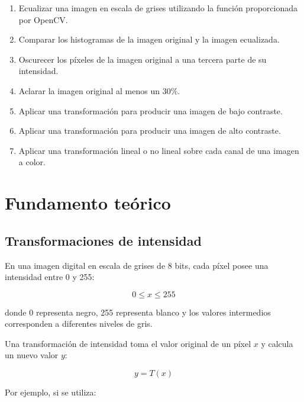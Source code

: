 \documentclass[11pt,letterpaper]{article}
\begin{document}
\begin{enumerate}
    \item Ecualizar una imagen en escala de grises utilizando la función proporcionada por OpenCV.
    
    \item Comparar los histogramas de la imagen original y la imagen ecualizada.
    
    \item Oscurecer los píxeles de la imagen original a una tercera parte de su intensidad.
    
    \item Aclarar la imagen original al menos un 30\%.
    
    \item Aplicar una transformación para producir una imagen de bajo contraste.
    
    \item Aplicar una transformación para producir una imagen de alto contraste.
    
    \item Aplicar una transformación lineal o no lineal sobre cada canal de una imagen a color.
\end{enumerate}


\section{Fundamento teórico}

\subsection{Transformaciones de intensidad}

En una imagen digital en escala de grises de 8 bits, cada píxel posee una intensidad entre 0 y 255:

\begin{equation}
0 \leq x \leq 255
\end{equation}

donde 0 representa negro, 255 representa blanco y los valores intermedios corresponden a diferentes niveles de gris.

Una transformación de intensidad toma el valor original de un píxel $x$ y calcula un nuevo valor $y$:

\begin{equation}
y=T(x)
\end{equation}

Por ejemplo, si se utiliza:
\end{document}
